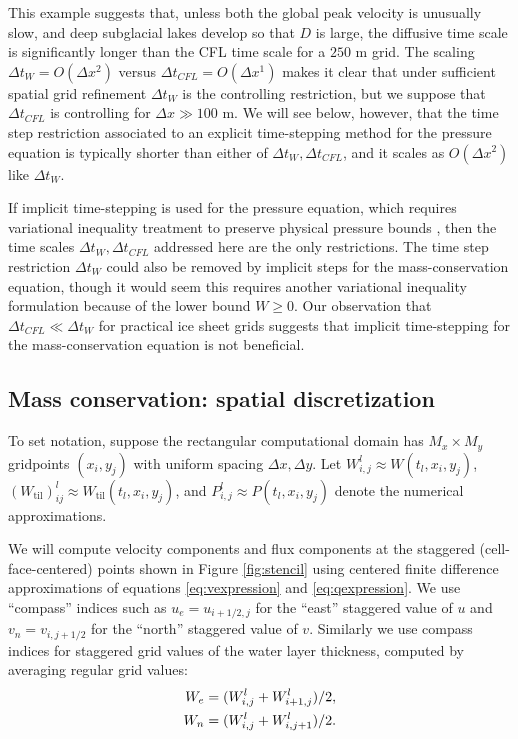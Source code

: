 \documentclass[gmd]{copernicus}   %
\newcommand{\text}{\textrm}
\newcommand{\Wtil}{W_{\text{til}}}
\newcommand{\Wlij}{W^l_{i,j}}
\newcommand{\Plij}{P^l_{i,j}}
\begin{document}
This example suggests that, unless both the global peak velocity is unusually slow, and deep subglacial lakes develop so that $D$ is large, the diffusive time scale is significantly longer than the CFL time scale for a $250$ m grid.  The scaling $\Delta t_W = O(\Delta x^2)$ versus $\Delta t_{CFL} = O(\Delta x^1)$ makes it clear that under sufficient spatial grid refinement $\Delta t_W$ is the controlling restriction, but we suppose that $\Delta t_{CFL}$ is controlling for $\Delta x \gg 100$ m.  We will see below, however, that the time step restriction associated to an explicit time-stepping method for the pressure equation is typically shorter than either of $\Delta t_W,\Delta t_{CFL}$, and it scales as $O(\Delta x^2)$ like $\Delta t_W$.

If implicit time-stepping is used for the pressure equation, which requires variational inequality treatment to preserve physical pressure bounds \citep{Schoofetal2012}, then the time scales $\Delta t_W, \Delta t_{CFL}$ addressed here are the only restrictions.  The time step restriction $\Delta t_W$ could also be removed by implicit steps for the mass-conservation equation, though it would seem this requires another variational inequality formulation because of the lower bound $W\ge 0$.  Our observation that $\Delta t_{CFL} \ll \Delta t_W$ for practical ice sheet grids suggests that implicit time-stepping for the mass-conservation equation is not beneficial.

\subsection{Mass conservation: spatial discretization}  To set notation, suppose the rectangular computational domain has $M_x \times M_y$ gridpoints $(x_i,y_j)$ with uniform spacing $\Delta x,\Delta y$.  Let $\Wlij \approx W(t_l,x_i,y_j)$, $(\Wtil)_{ij}^l \approx \Wtil(t_l,x_i,y_j)$, and $\Plij \approx P(t_l,x_i,y_j)$ denote the numerical approximations.

We will compute velocity components and flux components at the staggered (cell-face-centered) points shown in Figure \ref{fig:stencil} using centered finite difference approximations of equations \eqref{eq:vexpression} and \eqref{eq:qexpression}.  We use ``compass'' indices such as $u_e = u_{i+1/2,j}$ for the ``east'' staggered value of $u$ and $v_n = v_{i,j+1/2}$ for the ``north'' staggered value of $v$.  Similarly we use compass indices for staggered grid values of the water layer thickness, computed by averaging regular grid values:
\begin{align}
W_e &= (W_{i,j}^l + W_{i+1,j}^l)/2, \label{eq:stagW} \\
W_n &= (W_{i,j}^l + W_{i,j+1}^l)/2. \notag
\end{align}
\end{document}

